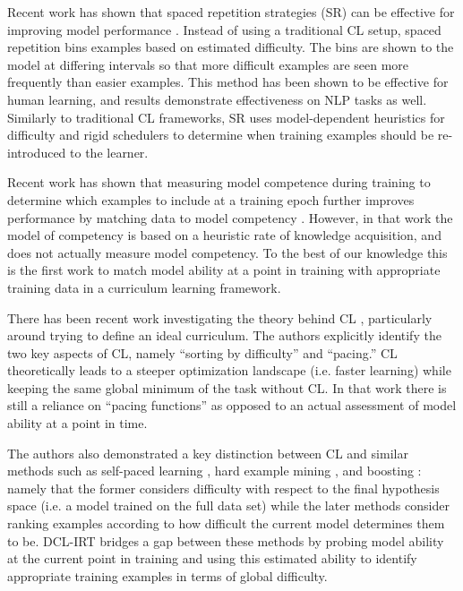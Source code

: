 \documentclass[letterpaper]{article} %
\begin{document}
Recent work has shown that spaced repetition strategies (SR) can be effective for improving model performance \cite{amiri_repeat_2017,amiri_neural_2019}.
Instead of using a traditional CL setup, spaced repetition bins examples based on estimated difficulty.
The bins are shown to the model at differing intervals so that more difficult examples are seen more frequently than easier examples.
This method has been shown to be effective for human learning, and results demonstrate effectiveness on NLP tasks as well.
Similarly to traditional CL frameworks, SR uses model-dependent heuristics for difficulty and rigid schedulers to determine when training examples should be re-introduced to the learner.

Recent work has shown that measuring model competence during training to determine which examples to include at a training epoch further improves performance by matching data to model competency \cite{platanios_competence-based_2019}.
However, in that work the model of competency is based on a heuristic rate of knowledge acquisition, and does not actually measure model competency.
To the best of our knowledge this is the first work to match model ability at a point in training with appropriate training data in a curriculum learning framework.

There has been recent work investigating the theory behind CL \cite{weinshall_curriculum_2018-1,hacohen_power_2019-2}, particularly around trying to define an ideal curriculum.
The authors explicitly identify the two key aspects of CL, namely ``sorting by difficulty'' and ``pacing.''
CL theoretically leads to a steeper optimization landscape (i.e. faster learning) while keeping the same global minimum of the task without CL.
In that work there is still a reliance on ``pacing functions'' as opposed to an actual assessment of model ability at a point in time.

The authors also demonstrated a key distinction between CL and similar methods such as self-paced learning \cite{kumar_self-paced_2010}, hard example mining \cite{shrivastava_training_2016}, and boosting \cite{freund_experiments_1996,freund_decision-theoretic_1997}: namely that the former considers difficulty with respect to the final hypothesis space (i.e. a model trained on the full data set) while the later methods consider ranking examples according to how difficult the current model determines them to be.
DCL-IRT bridges a gap between these methods by probing model ability at the current point in training and using this estimated ability to identify appropriate training examples in terms of global difficulty.
\end{document}
